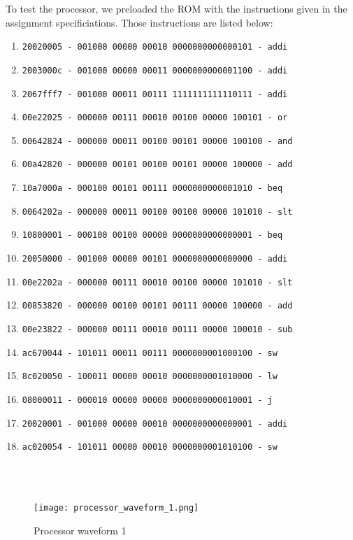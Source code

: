 \documentclass{article}
\begin{document}
To test the processor, we preloaded the ROM with the instructions given in the assignment specificiations. Those instructions are listed below: 
\begin{enumerate}
	\item \texttt{20020005 - 001000 00000 00010 0000000000000101 - addi} 
	\item \texttt{2003000c - 001000 00000 00011 0000000000001100 - addi} 
	\item \texttt{2067fff7 - 001000 00011 00111 1111111111110111 - addi} 
	\item \texttt{00e22025 - 000000 00111 00010 00100 00000 100101 - or}
	\item \texttt{00642824 - 000000 00011 00100 00101 00000 100100 - and}
	\item \texttt{00a42820 - 000000 00101 00100 00101 00000 100000 - add}
	\item \texttt{10a7000a - 000100 00101 00111 0000000000001010 - beq}
	\item \texttt{0064202a - 000000 00011 00100 00100 00000 101010 - slt}
	\item \texttt{10800001 - 000100 00100 00000 0000000000000001 - beq}
	\item \texttt{20050000 - 001000 00000 00101 0000000000000000 - addi}
	\item \texttt{00e2202a - 000000 00111 00010 00100 00000 101010 - slt}
	\item \texttt{00853820 - 000000 00100 00101 00111 00000 100000 - add}
	\item \texttt{00e23822 - 000000 00111 00010 00111 00000 100010 - sub}
	\item \texttt{ac670044 - 101011 00011 00111 0000000001000100 - sw}
	\item \texttt{8c020050 - 100011 00000 00010 0000000001010000 - lw}
	\item \texttt{08000011 - 000010 00000 00000 0000000000010001 - j}
	\item \texttt{20020001 - 001000 00000 00010 0000000000000001 - addi}
	\item \texttt{ac020054 - 101011 00000 00010 0000000001010100 - sw}
\end{enumerate}

\\ \\
\begin{figure}[!ht]
	\centering
		\texttt{[image: processor\_waveform\_1.png]}
		\caption{Processor waveform 1}
\end{figure}
\\ \\
\end{document}
